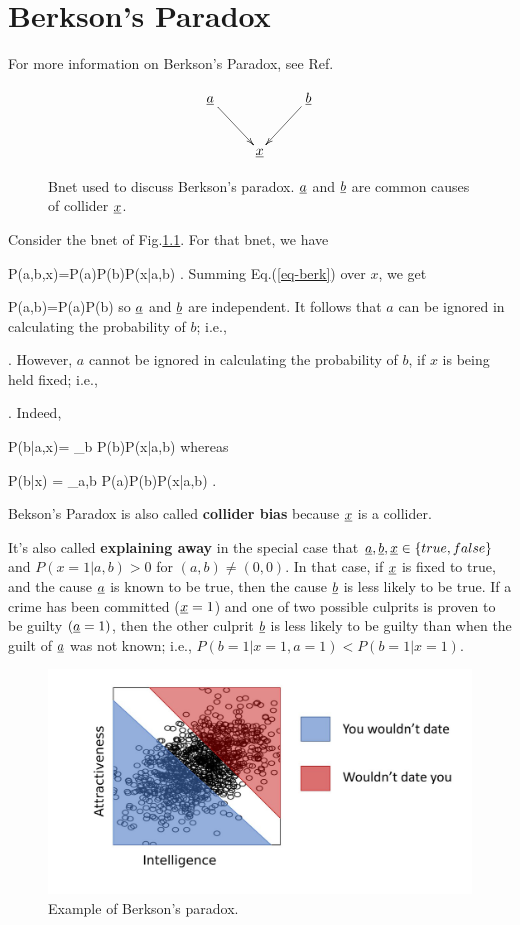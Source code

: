 \chapter{Berkson's Paradox }

For more information
on Berkson's Paradox, see
Ref.\cite{wiki-berkson}


\begin{figure}[h!]
$$
\xymatrix{
\rva\ar[rd]
&&\rvb\ar[ld]
\\
&\rvx
}
$$
\caption{
Bnet used to discuss Berkson's paradox.
${\underline{a}}$ and ${\underline{b}}$ are common causes of
collider
${\underline{x}}$.}
\label{fig-berkson-bnet}
\end{figure}

Consider the bnet of Fig.\ref{fig-berkson-bnet}.
For that bnet, we have

\beq
P(a,b,x)=P(a)P(b)P(x|a,b)
\;.
\label{eq-berk}
\eeq
Summing Eq.(\ref{eq-berk}) over $x$, we get

\beq
P(a,b)=P(a)P(b)
\eeq
so ${\underline{a}}$ and ${\underline{b}}$ are independent.
It follows that
$a$ can be ignored in calculating
the probability of $b$; i.e.,

\beq
{}
\;.
\eeq
However,
$a$ cannot be ignored in calculating
the probability of $b$,
if $x$ is being held fixed; i.e., 
 

\beq
{}
\;.
\eeq
Indeed,

\beq
P(b|a,x)=
{\sum_b P(b)P(x|a,b)}
\eeq
whereas

\beq
P(b|x)
=
{\sum_{a,b} P(a)P(b)P(x|a,b)}
\;.
\eeq


Bekson's Paradox is also called  {\bf collider bias} because 
${\underline{x}}$ is a collider.

It's also called {\bf explaining away}
in the special case that
${\underline{a}},{\underline{b}}, {\underline{x}}\in \{true, false\}$
and $P(x=1|a,b)>0$ for $(a,b)\neq (0,0)$.
In that case, if ${\underline{x}}$ is fixed
to true, and the cause
${\underline{a}}$ is known to be true, 
then the cause ${\underline{b}}$ is
less likely
to be true.
If a crime has been committed  (${\underline{x}}=1$)
and one
of two possible culprits is
proven to be guilty $({\underline{a}}=1)$, then
the other culprit ${\underline{b}}$ is 
less likely to be guilty
than when the guilt
of ${\underline{a}}$ was not known; i.e., 
$P(b=1|x=1,a=1)<P(b=1|x=1)$.


\begin{figure}[h!]
\centering
\includegraphics[width=5in]
{berkson/berkson.png}
\caption{
Example
of Berkson's paradox.} 
\label{fig-berkson}
\end{figure}


